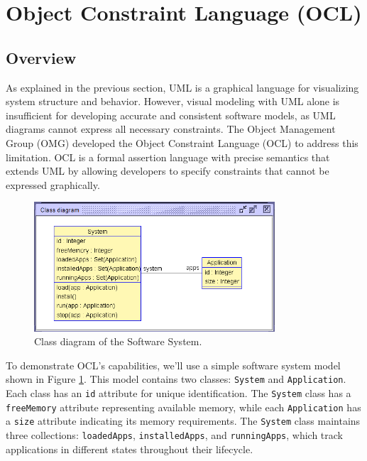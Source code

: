 \section{Object Constraint Language (OCL)}
\label{sec:ocl}

\subsection{Overview}

\hspace{1cm} As explained in the previous section, UML is a graphical language for 
visualizing system structure and behavior. However, visual modeling with UML alone 
is insufficient for developing accurate and consistent software models, as UML 
diagrams cannot express all necessary constraints. The Object Management Group (OMG) 
developed the Object Constraint Language (OCL) to address this limitation. 
OCL is a formal assertion language with precise semantics that extends UML by 
allowing developers to specify constraints that cannot be expressed graphically. 

\begin{figure}
    \begin{center}
        \includegraphics[width=0.8\textwidth]{figures/c1/SoftwareSystem/SS_Ver2.png}
        \caption{Class diagram of the Software System.}
        \label{fig:class_diagram_software_system}
    \end{center}
\end{figure}

To demonstrate OCL's capabilities, we'll use a simple software system model shown 
in Figure \ref{fig:class_diagram_software_system}. This model contains two classes: 
\texttt{System} and \texttt{Application}. Each class has an \texttt{id} attribute 
for unique identification. The \texttt{System} class has a \texttt{freeMemory} attribute 
representing available memory, while each \texttt{Application} has a \texttt{size} 
attribute indicating its memory requirements. The \texttt{System} class maintains three 
collections: \texttt{loadedApps}, \texttt{installedApps}, and \texttt{runningApps}, which 
track applications in different states throughout their lifecycle.


